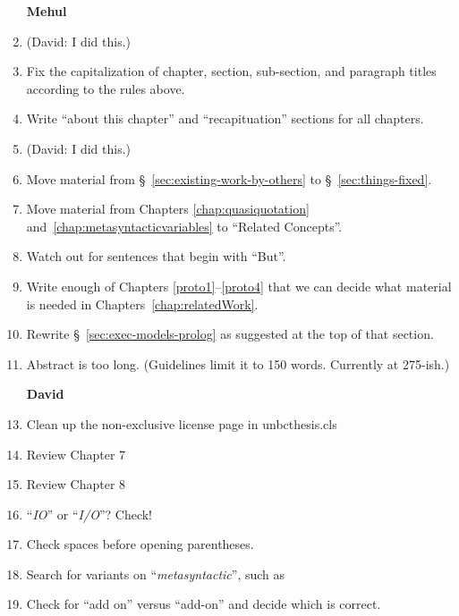 \begin{scope}
\begin{enumerate}
\item [\textbf{Mehul}]

\item (David: I did this.)

\item
  Fix the capitalization of chapter,
  section, sub-section, and paragraph titles according to the rules above.

\item
  Write ``about this chapter'' and ``recapituation'' sections for all chapters.

\item
  (David: I did this.)

\item
    Move material from \S~\ref{sec:existing-work-by-others} to \S~\ref{sec:things-fixed}. 

  \item

Move material from Chapters \ref{chap:quasiquotation} and~\ref{chap:metasyntacticvariables} to ``Related Concepts''.    
    

\item
  Watch out for sentences that begin with ``But''.

\item
  Write enough of Chapters \ref{proto1}--\ref{proto4} that we can decide
  what material is needed in Chapters~\ref{chap:relatedWork}.

\item
  Rewrite \S~\ref{sec:exec-models-prolog} as suggested at the top of that section. 

\item
  Abstract is too long.  (Guidelines limit it to 150 words.  Currently
  at 275-ish.)



\item [\textbf{David}]
\item Clean up the non-exclusive license page in unbcthesis.cls
\item Review Chapter 7
\item Review Chapter 8
\item ``\textit{IO}'' or ``\textit{I/O}''?  Check!
\item Check spaces before opening parentheses.
\item Search for variants on ``\textit{metasyntactic}'', such as
\item Check for ``add on'' versus ``add-on'' and decide which is correct.
\end{enumerate}


\end{scope}
